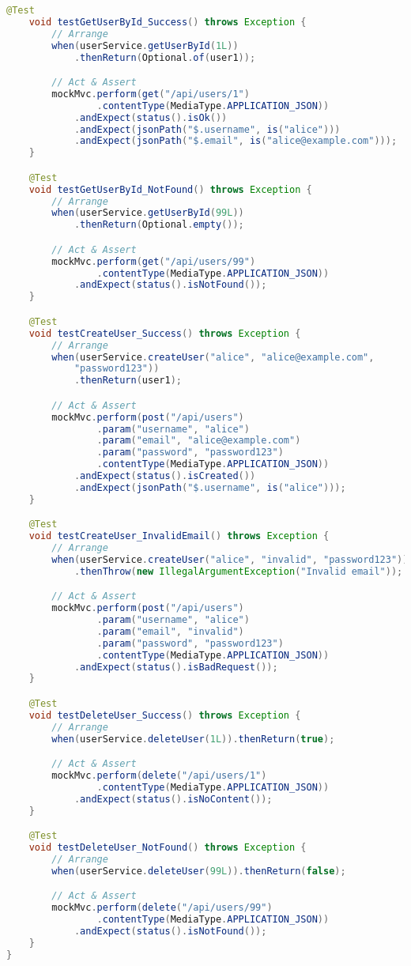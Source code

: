 \documentclass[12pt,a4paper]{article}
\begin{document}
\begin{lstlisting}[language=java, caption=UserControllerTest.java - Controller Layer Tests]
    @Test
    void testGetUserById_Success() throws Exception {
        // Arrange
        when(userService.getUserById(1L))
            .thenReturn(Optional.of(user1));

        // Act & Assert
        mockMvc.perform(get("/api/users/1")
                .contentType(MediaType.APPLICATION_JSON))
            .andExpect(status().isOk())
            .andExpect(jsonPath("$.username", is("alice")))
            .andExpect(jsonPath("$.email", is("alice@example.com")));
    }

    @Test
    void testGetUserById_NotFound() throws Exception {
        // Arrange
        when(userService.getUserById(99L))
            .thenReturn(Optional.empty());

        // Act & Assert
        mockMvc.perform(get("/api/users/99")
                .contentType(MediaType.APPLICATION_JSON))
            .andExpect(status().isNotFound());
    }

    @Test
    void testCreateUser_Success() throws Exception {
        // Arrange
        when(userService.createUser("alice", "alice@example.com",
            "password123"))
            .thenReturn(user1);

        // Act & Assert
        mockMvc.perform(post("/api/users")
                .param("username", "alice")
                .param("email", "alice@example.com")
                .param("password", "password123")
                .contentType(MediaType.APPLICATION_JSON))
            .andExpect(status().isCreated())
            .andExpect(jsonPath("$.username", is("alice")));
    }

    @Test
    void testCreateUser_InvalidEmail() throws Exception {
        // Arrange
        when(userService.createUser("alice", "invalid", "password123"))
            .thenThrow(new IllegalArgumentException("Invalid email"));

        // Act & Assert
        mockMvc.perform(post("/api/users")
                .param("username", "alice")
                .param("email", "invalid")
                .param("password", "password123")
                .contentType(MediaType.APPLICATION_JSON))
            .andExpect(status().isBadRequest());
    }

    @Test
    void testDeleteUser_Success() throws Exception {
        // Arrange
        when(userService.deleteUser(1L)).thenReturn(true);

        // Act & Assert
        mockMvc.perform(delete("/api/users/1")
                .contentType(MediaType.APPLICATION_JSON))
            .andExpect(status().isNoContent());
    }

    @Test
    void testDeleteUser_NotFound() throws Exception {
        // Arrange
        when(userService.deleteUser(99L)).thenReturn(false);

        // Act & Assert
        mockMvc.perform(delete("/api/users/99")
                .contentType(MediaType.APPLICATION_JSON))
            .andExpect(status().isNotFound());
    }
}
\end{lstlisting}
\end{document}

